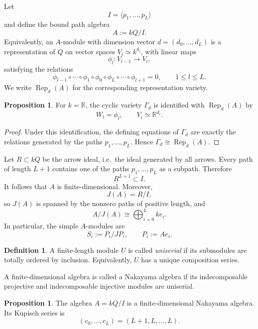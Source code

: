 \documentclass[11pt]{article}
\newcommand{\Rep}{\operatorname{Rep}}
\theoremstyle{definition}
\newtheorem{proposition}[theorem]{Proposition}
\newtheorem{definition}[theorem]{Definition}
\begin{document}
Let
\[
I=\langle p_1,\ldots,p_L\rangle
\]
and define the bound path algebra
\[
A:=kQ/I.
\]
Equivalently, an \(A\)-module with dimension vector
\(d=(d_0,\ldots,d_L)\) is a representation of \(Q\) on vector spaces
\(V_i\simeq k^{d_i}\), with linear maps
\[
\phi_l:V_{l-1}\longrightarrow V_l,
\]
satisfying the relations
\[
\phi_{l-1}\circ\cdots\circ \phi_1\circ \phi_0\circ \phi_L
\circ\cdots\circ \phi_{l+1}=0,
\qquad 1\leq l\leq L.
\]
We write \(\Rep_d(A)\) for the corresponding representation variety.

\begin{proposition}
For \(k=\mathbb R\), the cyclic variety \(\Gamma_d\) is identified with
\(\Rep_d(A)\) by
\[
W_l=\phi_l,
\qquad
V_i\simeq \mathbb R^{d_i}.
\]
\end{proposition}

\begin{proof}
Under this identification, the defining equations of \(\Gamma_d\) are
exactly the relations generated by the paths \(p_1,\ldots,p_L\). Hence
\(\Gamma_d\cong \Rep_d(A)\).
\end{proof}

Let \(R\subset kQ\) be the arrow ideal, i.e.\ the ideal generated by all
arrows. Every path of length \(L+1\) contains one of the paths
\(p_1,\ldots,p_L\) as a subpath. Therefore
\[
R^{L+1}\subset I.
\]
It follows that \(A\) is finite-dimensional. Moreover,
\[
J(A)=R/I,
\]
so \(J(A)\) is spanned by the nonzero paths of positive length, and
\[
A/J(A)\cong \bigoplus_{i=0}^L k e_i.
\]
In particular, the simple \(A\)-modules are
\[
S_i:=P_i/JP_i,
\qquad
P_i:=Ae_i.
\]

\begin{definition}
A finite-length module \(U\) is called \emph{uniserial} if its submodules
are totally ordered by inclusion. Equivalently, \(U\) has a unique
composition series.

A finite-dimensional algebra is called a Nakayama algebra if its
indecomposable projective and indecomposable injective modules are
uniserial.
\end{definition}

\begin{proposition}
The algebra \(A=kQ/I\) is a finite-dimensional Nakayama algebra. Its
Kupisch series is
\[
(c_0,\ldots,c_L)=(L+1,L,\ldots,L).
\]
\end{proposition}
\end{document}
